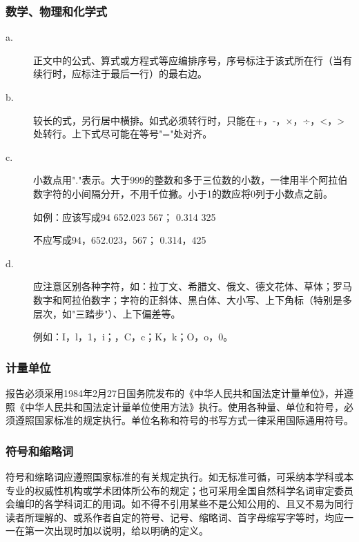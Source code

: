 \subsubsection{数学、物理和化学式}

\begin{description}

\item[a.] 正文中的公式、算式或方程式等应编排序号，序号标注于该式所在行（当有续行时，应标注于最后一行）的最右边。

\item[b.] 较长的式，另行居中横排。如式必须转行时，只能在+，-，×，÷，<，>处转行。上下式尽可能在等号"="处对齐。

\item[c.] 小数点用"."表示。大于999的整数和多于三位数的小数，一律用半个阿拉伯数字符的小间隔分开，不用千位撇。小于1的数应将0列于小数点之前。

如例：应该写成94  652.023  567；        0.314  325

不应写成94，652.023，567；          0.314，425

\item[d.] 应注意区别各种字符，如：拉丁文、希腊文、俄文、德文花体、草体；罗马数字和阿拉伯数字；字符的正斜体、黑白体、大小写、上下角标（特别是多层次，如"三踏步"）、上下偏差等。

例如：I，l，1，i；，C，c；K，k；O，o，0。

\end{description}


\subsubsection{计量单位}

报告必须采用1984年2月27日国务院发布的《中华人民共和国法定计量单位》，并遵照《中华人民共和国法定计量单位使用方法》执行。使用各种量、单位和符号，必须遵照国家标准的规定执行。单位名称和符号的书写方式一律采用国际通用符号。


\subsubsection{符号和缩略词}

符号和缩略词应遵照国家标准的有关规定执行。如无标准可循，可采纳本学科或本专业的权威性机构或学术团体所公布的规定；也可采用全国自然科学名词审定委员会编印的各学科词汇的用词。如不得不引用某些不是公知公用的、且又不易为同行读者所理解的、或系作者自定的符号、记号、缩略词、首字母缩写字等时，均应一一在第一次出现时加以说明，给以明确的定义。



